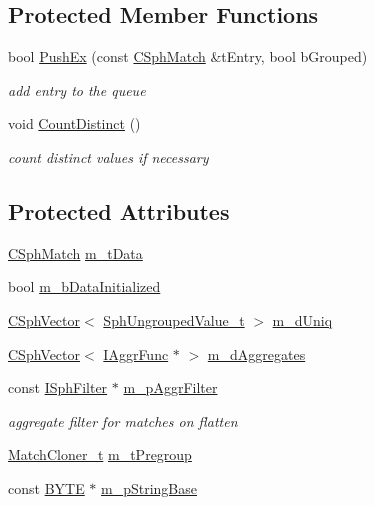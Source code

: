 \subsection*{Protected Member Functions}
\begin{DoxyCompactItemize}
\item 
bool \hyperlink{classCSphImplicitGroupSorter_ac61c1c4f60645dc23486b2da0ec3a0e2}{Push\-Ex} (const \hyperlink{classCSphMatch}{C\-Sph\-Match} \&t\-Entry, bool b\-Grouped)
\begin{DoxyCompactList}\small\item\em add entry to the queue \end{DoxyCompactList}\item 
void \hyperlink{classCSphImplicitGroupSorter_ac5f5701aa1688b2682202deed38567f7}{Count\-Distinct} ()
\begin{DoxyCompactList}\small\item\em count distinct values if necessary \end{DoxyCompactList}\end{DoxyCompactItemize}
\subsection*{Protected Attributes}
\begin{DoxyCompactItemize}
\item 
\hyperlink{classCSphMatch}{C\-Sph\-Match} \hyperlink{classCSphImplicitGroupSorter_aefb0a158f4108e85763c58290536305a}{m\-\_\-t\-Data}
\item 
bool \hyperlink{classCSphImplicitGroupSorter_aae070f7e16ffe91b39d706da20c249f8}{m\-\_\-b\-Data\-Initialized}
\item 
\hyperlink{classCSphVector}{C\-Sph\-Vector}$<$ \hyperlink{structSphUngroupedValue__t}{Sph\-Ungrouped\-Value\-\_\-t} $>$ \hyperlink{classCSphImplicitGroupSorter_a432280b67b6af6981ec97812b1b62650}{m\-\_\-d\-Uniq}
\item 
\hyperlink{classCSphVector}{C\-Sph\-Vector}$<$ \hyperlink{classIAggrFunc}{I\-Aggr\-Func} $\ast$ $>$ \hyperlink{classCSphImplicitGroupSorter_a9970bd32bde8634e4ad0839796422838}{m\-\_\-d\-Aggregates}
\item 
const \hyperlink{structISphFilter}{I\-Sph\-Filter} $\ast$ \hyperlink{classCSphImplicitGroupSorter_a0c09e454baa15f8a7f514b9a60e9fdac}{m\-\_\-p\-Aggr\-Filter}
\begin{DoxyCompactList}\small\item\em aggregate filter for matches on flatten \end{DoxyCompactList}\item 
\hyperlink{structMatchCloner__t}{Match\-Cloner\-\_\-t} \hyperlink{classCSphImplicitGroupSorter_ac201dd39488fb2367b54bf390f495085}{m\-\_\-t\-Pregroup}
\item 
const \hyperlink{sphinxstd_8h_a4ae1dab0fb4b072a66584546209e7d58}{B\-Y\-T\-E} $\ast$ \hyperlink{classCSphImplicitGroupSorter_a496d3aad55066ee694ec4dd17508e608}{m\-\_\-p\-String\-Base}
\end{DoxyCompactItemize}
